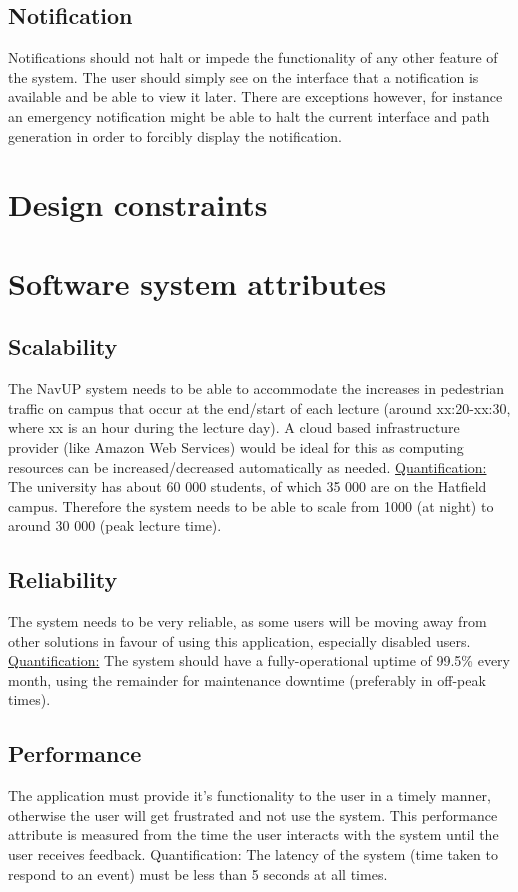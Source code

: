 \documentclass[english]{article}
\begin{document}
	\subsection{Notification}
Notifications should not halt or impede the functionality of any other feature of the system. The user should simply see on the interface that a notification is available and be able to view it later. There are exceptions however, for instance an emergency notification might be able to halt the current interface and path generation in order to forcibly display the notification. 
	\section{Design constraints}
	

	\section{Software system attributes}
	\subsection{Scalability}
	The NavUP system needs to be able to accommodate the increases in pedestrian traffic on campus that occur at the end/start of each lecture (around xx:20-xx:30, where xx is an hour during the lecture day). A cloud based infrastructure provider (like Amazon Web Services) would be ideal for this as computing resources can be increased/decreased automatically as needed.
	\newline
	\newline
	\underline{Quantification:} The university has about 60 000 students, of which 35 000 are on the Hatfield campus. Therefore the system needs to be able to scale from 1000 (at night) to around 30 000 (peak lecture time).
	\subsection{Reliability}
	The system needs to be very reliable, as some users will be moving away from other solutions in favour of using this application, especially disabled users.
	\newline
	\newline
	\underline{Quantification:} The system should have a fully-operational uptime of 99.5\% every month, using the remainder for maintenance downtime (preferably in off-peak times).
	\subsection{Performance}
	The application must provide it's functionality to the user in a timely manner, otherwise the user will get frustrated and not use the system. This performance attribute is measured from the time the user interacts with the system until the user receives feedback.
	\newline
	\newline
	{Quantification:} The latency of the system (time taken to respond to an event) must be less than 5 seconds at all times.
\end{document}
